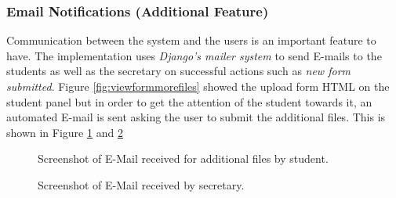 \documentclass[../main.tex]{subfiles}
\begin{document}
\subsubsection{Email Notifications (Additional Feature)}
Communication between the system and the users is an important feature to have. The implementation uses \textit{Django's mailer system} to send E-mails to the students as well as the secretary on successful actions such as \emph{new form submitted}. Figure \ref{fig:viewformmorefiles} showed the upload form HTML on the student panel but in order to get the attention of the student towards it, an automated E-mail is sent asking the user to submit the additional files. This is shown in Figure \ref{fig:emailuploadfiles} and \ref{fig:newformsub}

\begin{figure}[H]
        \caption{\label{fig:emailuploadfiles} Screenshot of E-Mail received for additional files by student.}
      \end{figure}

\begin{figure}[H]
        \caption{\label{fig:newformsub} Screenshot of E-Mail received by secretary.}
      \end{figure}
\end{document}
